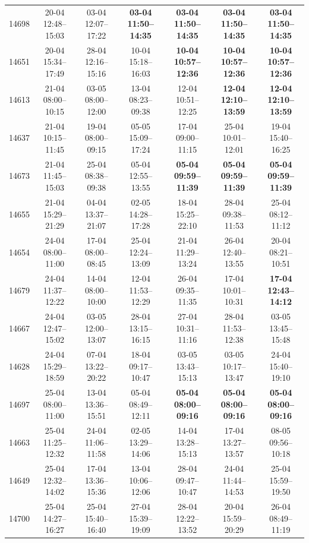 \begin{table}[htbp]
\begin{tabular}{|r|c|c|c|c|c|c|}
14698 & 20-04 12:48--15:03 & 03-04 12:07--17:22 & \textbf{03-04 11:50--14:35} & \textbf{03-04 11:50--14:35} & \textbf{03-04 11:50--14:35} & \textbf{03-04 11:50--14:35} \\ 
14651 & 20-04 15:34--17:49 & 28-04 12:16--15:16 & 10-04 15:18--16:03 & \textbf{10-04 10:57--12:36} & \textbf{10-04 10:57--12:36} & \textbf{10-04 10:57--12:36} \\ 
14613 & 21-04 08:00--10:15 & 03-05 08:00--12:00 & 13-04 08:23--09:38 & 12-04 10:51--12:25 & \textbf{12-04 12:10--13:59} & \textbf{12-04 12:10--13:59} \\ 
14637 & 21-04 10:15--11:45 & 19-04 08:00--09:15 & 05-05 15:09--17:24 & 17-04 09:00--11:15 & 25-04 10:01--12:01 & 19-04 15:40--16:25 \\ 
14673 & 21-04 11:45--15:03 & 25-04 08:38--09:38 & 05-04 12:55--13:55 & \textbf{05-04 09:59--11:39} & \textbf{05-04 09:59--11:39} & \textbf{05-04 09:59--11:39} \\ 
14655 & 21-04 15:29--21:29 & 04-04 13:37--21:07 & 02-05 14:28--17:28 & 18-04 15:25--22:10 & 28-04 09:38--11:53 & 25-04 08:12--11:12 \\ 
14654 & 24-04 08:00--11:00 & 17-04 08:00--08:45 & 25-04 12:24--13:09 & 21-04 11:29--13:24 & 26-04 12:40--13:55 & 20-04 08:21--10:51 \\ 
14679 & 24-04 11:37--12:22 & 14-04 08:00--10:00 & 12-04 11:53--12:29 & 26-04 09:35--11:35 & 17-04 10:01--10:31 & \textbf{17-04 12:43--14:12} \\ 
14667 & 24-04 12:47--15:02 & 03-05 12:00--13:07 & 28-04 13:15--16:15 & 27-04 10:31--11:16 & 28-04 11:53--12:38 & 03-05 13:45--15:48 \\ 
14628 & 24-04 15:29--18:59 & 07-04 13:22--20:22 & 18-04 09:17--10:47 & 03-05 13:43--15:13 & 03-05 10:17--13:47 & 24-04 15:40--19:10 \\ 
14697 & 25-04 08:00--11:00 & 13-04 13:36--15:51 & 05-04 08:49--12:11 & \textbf{05-04 08:00--09:16} & \textbf{05-04 08:00--09:16} & \textbf{05-04 08:00--09:16} \\ 
14663 & 25-04 11:25--12:32 & 24-04 11:06--11:58 & 02-05 13:29--14:06 & 14-04 13:28--15:13 & 17-04 13:27--13:57 & 08-05 09:56--10:18 \\ 
14649 & 25-04 12:32--14:02 & 17-04 13:36--15:36 & 13-04 10:06--12:06 & 28-04 09:47--10:47 & 24-04 11:44--14:53 & 25-04 15:59--19:50 \\ 
14700 & 25-04 14:27--16:27 & 25-04 15:40--16:40 & 27-04 15:39--19:09 & 28-04 12:22--13:52 & 20-04 15:59--20:29 & 26-04 08:49--11:19 \\ 

\end{tabular}
\end{table}
